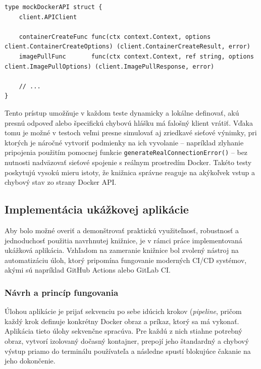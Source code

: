 \documentclass[
 program=infpvs,
  language=slovak,
  figures=false,
  tables=false,
  sourcecodes,
  glossaries,
  index
]{kidiplom}
\begin{document}
{\begin{lstlisting}[caption={Ukážka definície falošného klienta pre testovanie rozhrania.}, label={lst:mock-client}]
type mockDockerAPI struct {
    client.APIClient

    containerCreateFunc func(ctx context.Context, options client.ContainerCreateOptions) (client.ContainerCreateResult, error)
    imagePullFunc       func(ctx context.Context, ref string, options client.ImagePullOptions) (client.ImagePullResponse, error)
    
    // ...
}
\end{lstlisting}

Tento prístup umožňuje v každom teste dynamicky a lokálne definovať, akú presnú odpoveď alebo špecifickú chybovú hlášku má falošný klient vrátiť. Vďaka tomu je možné v testoch veľmi presne simulovať aj zriedkavé sieťové výnimky, pri ktorých je náročné vytvoriť podmienky na ich vyvolanie – napríklad zlyhanie pripojenia použitím pomocnej funkcie \texttt{generateRealConnectionError()} – bez nutnosti nadväzovať sieťové spojenie s reálnym prostredím Docker. Takéto testy poskytujú vysokú mieru istoty, že knižnica správne reaguje na akýkoľvek vstup a chybový stav zo strany Docker API.



\subsection{Implementácia ukážkovej aplikácie}  \label{sec:ukazkova-aplikacia}
Aby bolo možné overiť a demonštrovať praktickú využiteľnosť, robustnosť a jednoduchosť použitia navrhnutej knižnice, je v rámci práce implementovaná ukážková aplikácia. Vzhľadom na zameranie knižnice bol zvolený nástroj na automatizáciu úloh, ktorý pripomína fungovanie moderných CI/CD systémov, akými sú napríklad GitHub Actions alebo GitLab CI.



\subsubsection{Návrh a princíp fungovania}  \label{sec:navrh-ukazky}
Úlohou aplikácie je prijať sekvenciu po sebe idúcich krokov (\textit{pipeline}, pričom každý krok definuje konkrétny Docker obraz a príkaz, ktorý sa má vykonať. Aplikácia tieto úlohy sekvenčne spracúva. Pre každú z nich stiahne potrebný obraz, vytvorí izolovaný dočasný kontajner, prepojí jeho štandardný a chybový výstup priamo do terminálu používateľa a následne spustí blokujúce čakanie na jeho dokončenie. 

}
\end{document}
